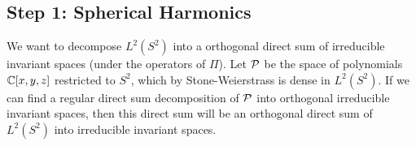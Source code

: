 \subsection{Step 1: Spherical Harmonics}
We want to decompose $L^2(S^2)$ into a orthogonal direct sum of irreducible invariant spaces (under the operators of $\Pi$). Let ${\mathcal P}$ be the space of polynomials ${\mathbb C}[x,y,z]$ restricted to $S^2$, which by Stone-Weierstrass is dense in $L^2(S^2)$. If we can find a regular direct sum decomposition of ${\mathcal P}$ into orthogonal irreducible invariant spaces, then this direct sum will be an orthogonal direct sum of $L^2(S^2)$ into irreducible invariant spaces.
